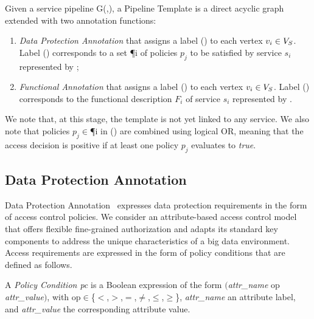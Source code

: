 \begin{definition} \label{def:template}
  Given a service pipeline G(\V,\E), a Pipeline Template \tChartFunction is a direct acyclic graph extended with two annotation functions:
  \begin{enumerate}
    \item \emph{Data Protection Annotation} \myLambda that assigns a label \myLambda() to each vertex $v_{i}\in V_S$. Label \myLambda() corresponds to a set \P{i} of policies $p_j$ to be satisfied by service $s_i$ represented by ;
    \item \emph{Functional Annotation} \myGamma that assigns a label \myGamma() to each vertex $v_{i}\in V_S$. Label \myGamma() corresponds to the functional description $F_i$ of service $s_i$ represented by .
  \end{enumerate}
\end{definition}

\vspace{0.5em}

We note that, at this stage, the template is not yet linked to any service.
We also note that policies $p_j$$\in$\P{i} in \myLambda() are combined using logical OR, meaning that the access decision is positive if at least one policy $p_j$ evaluates to \emph{true}.
      \subsection{Data Protection Annotation}\label{sec:nonfuncannotation}
      Data Protection Annotation \myLambda\ expresses data protection requirements in the form of access control policies. We consider an attribute-based access control model that offers flexible fine-grained authorization and adapts its standard key components to address the unique characteristics of a big data environment. Access requirements are expressed in the form of policy conditions that are defined as follows.

      \vspace{0.5em}

      \begin{definition}\label{def:policy_cond}
        A \emph{Policy Condition pc} is a Boolean expression of the form $($\emph{attr\_name} op \emph{attr\_value}$)$, with op$\in$\{$<$,$>$,$=$,$\neq$,$\leq$,$\geq$\}, \emph{attr\_name} an attribute label, and \emph{attr\_value} the corresponding attribute value.
      \end{definition}

